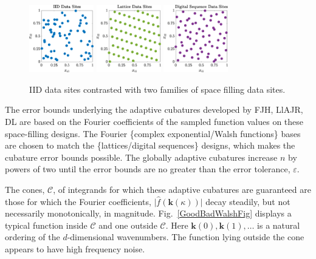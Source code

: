 \documentclass[11pt]{NSFamsart}
\newcommand{\hf}{\widehat{f}}
\newcommand{\bk}{{\boldsymbol{k}}}
\newcommand{\calc}{{\mathcal{C}}}
\newcommand{\bigabs}[1]{\ensuremath{\bigl \lvert #1 \bigr \rvert}}
\begin{document}
\begin{figure}[h] %
	\centering
	\includegraphics[width = 0.25\textwidth]{ProgramsImages/IIDPoints.eps} \quad
	\includegraphics[width = 0.25\textwidth]{ProgramsImages/ShiftedLatticePoints.eps}  \quad
	\includegraphics[width = 0.25\textwidth]{ProgramsImages/SSobolPoints.eps} 
	
	\caption{IID data sites contrasted with two families of space filling data sites.\label{PtsFig}}
\end{figure}

The error bounds underlying the adaptive cubatures developed by FJH, LlAJR, DL are based on the Fourier coefficients of the sampled function values on these space-filling designs.  The Fourier  \{complex exponential/Walsh functions\} bases are chosen to match the \{lattices/digital sequences\}  designs, which makes the cubature error bounds possible.  The globally adaptive cubatures increase $n$ by powers of two until the error bounds are no greater than the error tolerance, $\varepsilon$.

The cones, $\calc$, of integrands for which these adaptive cubatures are guaranteed are those for which  the Fourier coefficients, $\bigabs{\hf(\bk(\kappa))}$ decay steadily, but not necessarily monotonically, in magnitude.  Fig.\ \ref{GoodBadWalshFig} displays a typical function inside $\calc$ and one outside $\calc$. Here $\bk(0), \bk(1), \ldots$ is a natural ordering of the $d$-dimensional wavenumbers.  The function lying outside the cone appears to have high frequency noise. 
\end{document}
